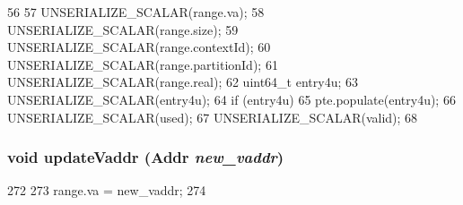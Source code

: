 \begin{DoxyCode}
56 {
57     UNSERIALIZE_SCALAR(range.va);
58     UNSERIALIZE_SCALAR(range.size);
59     UNSERIALIZE_SCALAR(range.contextId);
60     UNSERIALIZE_SCALAR(range.partitionId);
61     UNSERIALIZE_SCALAR(range.real);
62     uint64_t entry4u;
63     UNSERIALIZE_SCALAR(entry4u);
64     if (entry4u)
65         pte.populate(entry4u);
66     UNSERIALIZE_SCALAR(used);
67     UNSERIALIZE_SCALAR(valid);
68 }
\end{DoxyCode}
\hypertarget{structSparcISA_1_1TlbEntry_a5b72666b92ee0adbe9a7d218a0343754}{
\subsubsection[{updateVaddr}]{\setlength{\rightskip}{0pt plus 5cm}void updateVaddr ({\bf Addr} {\em new\_\-vaddr})}}
\label{structSparcISA_1_1TlbEntry_a5b72666b92ee0adbe9a7d218a0343754}



\begin{DoxyCode}
272     {
273         range.va = new_vaddr;
274     }
\end{DoxyCode}


